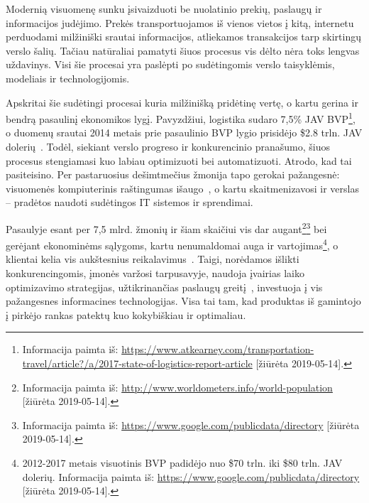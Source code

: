 

Modernią visuomenę sunku įsivaizduoti be nuolatinio prekių, paslaugų ir informacijos judėjimo. Prekės transportuojamos iš vienos vietos į kitą, internetu perduodami milžiniški srautai informacijos, atliekamos transakcijos tarp skirtingų verslo šalių. Tačiau natūraliai pamatyti šiuos procesus vis dėlto nėra toks lengvas uždavinys. Visi šie procesai yra paslėpti po sudėtingomis verslo taisyklėmis, modeliais ir technologijomis. 

Apskritai šie sudėtingi procesai kuria milžinišką pridėtinę vertę, o kartu gerina ir bendrą pasaulinį ekonomikos lygį. Pavyzdžiui, logistika sudaro 7,5\% JAV BVP\footnote{Informacija paimta iš: \href{https://www.atkearney.com/transportation-travel/article?/a/2017-state-of-logistics-report-article}{https://www.atkearney.com/transportation-travel/article?/a/2017-state-of-logistics-report-article} [žiūrėta 2019-05-14].}, o duomenų srautai 2014 metais prie pasaulinio BVP lygio prisidėjo \$2.8 trln. JAV dolerių~\cite{manyika2016digital}. Todėl, siekiant verslo progreso ir konkurencinio pranašumo, šiuos procesus stengiamasi kuo labiau optimizuoti bei automatizuoti. Atrodo, kad tai pasiteisino. Per pastaruosius dešimtmečius žmonija tapo gerokai pažangesnė: visuomenės kompiuterinis raštingumas išaugo~\cite{van2015internet}, o kartu skaitmenizavosi ir verslas – pradėtos naudoti sudėtingos IT sistemos ir sprendimai.

Pasaulyje esant per 7,5 mlrd. žmonių ir šiam skaičiui vis dar augant\footnote{Informacija paimta iš: \href{http://www.worldometers.info/world-population}{http://www.worldometers.info/world-population} [žiūrėta 2019-05-14].}\footnote{Informacija paimta iš: \href{https://www.google.com/publicdata/directory}{https://www.google.com/publicdata/directory} [žiūrėta 2019-05-14].} bei gerėjant ekonominėms sąlygoms, kartu nenumaldomai auga ir vartojimas\footnote{2012-2017 metais visuotinis BVP padidėjo nuo \$70 trln. iki \$80 trln. JAV dolerių. Informacija paimta iš: \href{https://www.google.com/publicdata/directory}{https://www.google.com/publicdata/directory} [žiūrėta 2019-05-14].}, o klientai kelia vis aukštesnius reikalavimus~\cite{nilsson2006logistics}. Taigi, norėdamos išlikti konkurencingomis, įmonės varžosi tarpusavyje, naudoja įvairias laiko optimizavimo strategijas, užtikrinančias paslaugų greitį~\cite{zacharia2004logistics}, investuoja į vis pažangesnes informacines technologijas. Visa tai tam, kad produktas iš gamintojo į pirkėjo rankas patektų kuo kokybiškiau ir optimaliau.

